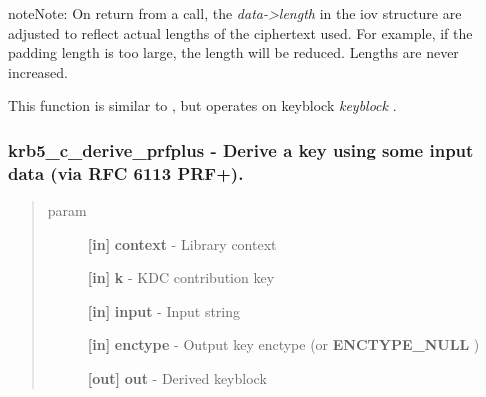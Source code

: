\documentclass[letterpaper,10pt,english]{sphinxmanual}
\begin{document}


{\hyperref[appdev/refs/api/krb5_c_decrypt_iov:c.krb5_c_decrypt_iov]{}}



\begin{notice}{note}{Note:}
On return from a {\hyperref[appdev/refs/api/krb5_c_decrypt_iov:c.krb5_c_decrypt_iov]{}} call, the \emph{data-\textgreater{}length} in the iov structure are adjusted to reflect actual lengths of the ciphertext used. For example, if the padding length is too large, the length will be reduced. Lengths are never increased.

This function is similar to {\hyperref[appdev/refs/api/krb5_k_decrypt_iov:c.krb5_k_decrypt_iov]{}} , but operates on keyblock \emph{keyblock} .
\end{notice}


\subsubsection{krb5\_c\_derive\_prfplus -  Derive a key using some input data (via RFC 6113 PRF+).}
\label{appdev/refs/api/krb5_c_derive_prfplus::doc}\label{appdev/refs/api/krb5_c_derive_prfplus:krb5-c-derive-prfplus-derive-a-key-using-some-input-data-via-rfc-6113-prf}

\begin{fulllineitems}
\label{appdev/refs/api/krb5_c_derive_prfplus:c.krb5_c_derive_prfplus}
\end{fulllineitems}

\begin{quote}\begin{description}
\item[{param}] \leavevmode
\textbf{{[}in{]}} \textbf{context} - Library context

\textbf{{[}in{]}} \textbf{k} - KDC contribution key

\textbf{{[}in{]}} \textbf{input} - Input string

\textbf{{[}in{]}} \textbf{enctype} - Output key enctype (or \textbf{ENCTYPE\_NULL} )

\textbf{{[}out{]}} \textbf{out} - Derived keyblock

\end{description}\end{quote}
\end{document}
